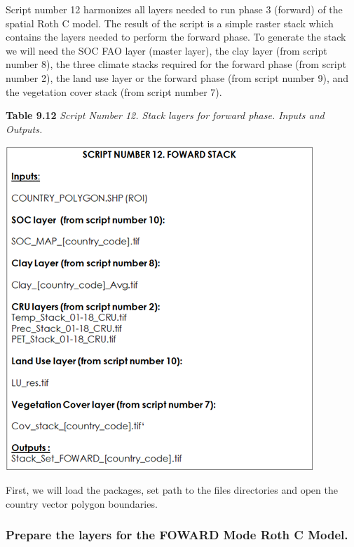 \documentclass[
  10pt,
  b5paper,
]{book}
\begin{document}
Script number 12 harmonizes all layers needed to run phase 3 (forward) of the spatial Roth C model. The result of the script is a simple raster stack which contains the layers needed to perform the forward phase. To generate the stack we will need the SOC FAO layer (master layer), the clay layer (from script number 8), the three climate stacks required for the forward phase (from script number 2), the land use layer or the forward phase (from script number 9), and the vegetation cover stack (from script number 7).

\textbf{Table 9.12} \emph{Script Number 12. Stack layers for forward phase. Inputs and Outputs.}

\includegraphics{tables/Table_9.11.png}

First, we will load the packages, set path to the files directories and open the country vector polygon boundaries.

\hypertarget{prepare-the-layers-for-the-foward-mode-roth-c-model.}{%
\subsubsection{Prepare the layers for the FOWARD Mode Roth C Model.}\label{prepare-the-layers-for-the-foward-mode-roth-c-model.}}
\end{document}
